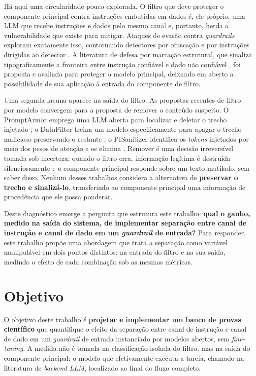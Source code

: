 Há aqui uma circularidade pouco explorada. O filtro que deve proteger o
componente principal contra instruções embutidas em dados é, ele próprio, uma
LLM que recebe instruções e dados pelo mesmo canal e, portanto, herda a
vulnerabilidade que existe para mitigar. Ataques de evasão contra
\textit{guardrails} exploram exatamente isso, contornando detectores por
ofuscação e por instruções dirigidas ao detector \cite{hackett2025bypassing}. A
literatura de defesa por marcação estrutural, que sinaliza tipograficamente a
fronteira entre instrução confiável e dado não confiável \cite{hines2024spotlighting},
foi proposta e avaliada para proteger o modelo principal, deixando em aberto
a possibilidade de sua aplicação à entrada do componente de filtro.

Uma segunda lacuna aparece na saída do filtro. As propostas recentes de filtro
por modelo convergem para a proposta de remover o conteúdo suspeito.
O PromptArmor emprega uma LLM aberta para localizar e deletar o trecho injetado
\cite{shi2025promptarmor}; o DataFilter treina um modelo especificamente para
apagar o trecho malicioso preservando o restante \cite{wang2025datafilter}; o
PISanitizer identifica os \textit{tokens} injetados por meio dos pesos de
atenção e os elimina \cite{geng2025pisanitizer}. Remover é uma decisão
irreversível tomada sob incerteza: quando o filtro erra, informação legítima é
destruída silenciosamente e o componente principal responde sobre um texto
mutilado, sem saber disso. Nenhum desses trabalhos considera a alternativa de
\textbf{preservar o trecho e sinalizá-lo}, transferindo ao componente principal
uma informação de procedência que ele possa ponderar.

Deste diagnóstico emerge a pergunta que estrutura este trabalho:
\textbf{qual o ganho, medido na saída do sistema, de implementar separação entre
canal de instrução e canal de dado em um \textit{guardrail} de entrada?}
Para responder, este trabalho propõe uma abordagem que trata a separação como variável manipulável em dois pontos
distintos: na entrada do filtro e na sua saída, medindo o efeito de cada
combinação sob as mesmas métricas.

\section{Objetivo}\label{sec:objetivo}

O objetivo deste trabalho é \textbf{projetar e implementar um banco de provas
científico} que quantifique o efeito da separação entre canal de instrução e
canal de dado em um \textit{guardrail} de entrada instanciado por modelos
abertos, sem \textit{fine-tuning}. A medida não é tomada na classificação
isolada do filtro, mas na saída do componente principal: o modelo
que efetivamente executa a tarefa, chamado na literatura de \textit{backend LLM}, 
localizado ao final do fluxo completo.

